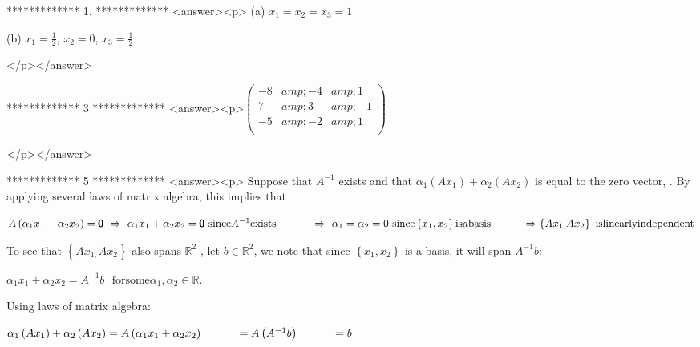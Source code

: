 *************
1.
*************
<answer><p> (a)   \(x_1= x_2=x_3= 1\)



    (b)  \(x_1= \frac{1}{2}\), \(x_2= 0\), \(x_{3 }= \frac{1}{2}\)

</p></answer>


*************
3
*************
<answer><p>\(\left(
\begin{array}{ccc}
 -8 &amp; -4 &amp; 1 \\
 7 &amp; 3 &amp; -1 \\
 -5 &amp; -2 &amp; 1 \\
\end{array}
\right)\)

</p></answer>


*************
5
*************
<answer><p> Suppose that \(A^{-1}\) exists and that \(\alpha _1\left(A x_1\right)+\alpha _2\left(A x_2\right)\) is equal to the zero vector, . By
applying several laws of matrix algebra, this implies that



 \(A\left(\alpha _1 x_1+\alpha _2 x_2\right)=\pmb{0}\pmb{\text{    }}\Rightarrow \text{  }\alpha _1 x_1+\alpha _2 x_2=\pmb{0}\pmb{\text{
      }}\text{since} A^{-1} \text{exists}\pmb{\text{    }}\\
\\
\quad \quad \quad \Rightarrow \text{  }\alpha _1 =\alpha _2 =0\text{              }\text{since} \left\{x_1,x_2\right\} \text{is} a\text{\textit{$
$}}\text{basis}\\
\\
\quad \quad \quad \Rightarrow  \left\{A x_{1,}A x_2\right\}\text{  }\text{is} \text{linearly} \text{independent}\)



To see that \(\left\{A x_{1,}A x_2\right\}\) also spans \(\mathbb{R}^2\) , let \(b\in \mathbb{R}^2\), we note that since \(\left\{x_1,x_2\right\}\)
is a basis, it will span \(A^{-1}b\):



 \(\alpha _1 x_1+\alpha _2 x_2=A^{-1}b\text{     }\text{for} \text{some} \alpha _1,\alpha _2\in  \mathbb{R}\).



Using laws of matrix algebra:



\(\alpha _1 \left(A x_1\right)+\alpha _2 \left(A x_2\right)=A\left(\alpha _1 x_1+\alpha _2 x_2\right)\\
\\
\quad \quad \quad =A\left(A^{-1}b\right)\\
\\
\quad \quad \quad = b\)



